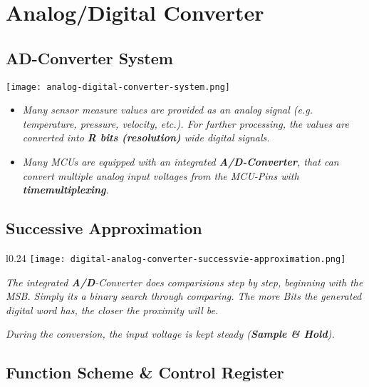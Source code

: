 \section{Analog/Digital Converter}

\subsection{AD-Converter System}

\texttt{[image: analog-digital-converter-system.png]}

\begin{itemize}
    \item{\textit{
        Many sensor measure values are provided as an analog signal
        (e.g. temperature, pressure, velocity, etc.). For further processing, the
        values are converted into \textbf{R bits (resolution)} wide digital signals.
    }}
    \item{\textit{
        Many MCUs are equipped with an integrated \textbf{A/D-Converter}, that can
        convert multiple analog input voltages from the MCU-Pins with \textbf{timemultiplexing}.
    }}
\end{itemize}

\subsection{Successive Approximation}

\begin{wrapfigure}{l}{0.24\textwidth}
    \centering
    \hspace{-20pt}
    \texttt{[image: digital-analog-converter-successvie-approximation.png]}
    \hspace{-50pt}
\end{wrapfigure}

\textit{
    The integrated \textbf{A/D}-Converter does comparisions
    step by step, beginning with the MSB.\newline
    Simply its a binary search through comparing.\newline
    The more Bits the generated digital word has,
    the closer the proximity will be.
}

\textit{
    During the conversion, the input voltage is kept
    steady (\textbf{Sample \& Hold}).
}

\subsection{Function Scheme \& Control Register}

